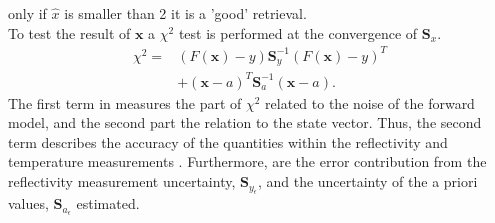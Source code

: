 only if $\hat{x}$ is smaller than \num{2} it is a 'good' retrieval. 
\\
To test the result of $\mathbf{x}$ a $\chi^2$ test is performed at the convergence of $\mathbf{S}_x$.
%
\begin{equation}
\begin{split}
\chi^2 = & \left( F(\mathbf{x}) - y  \right) \mathbf{S}_y^{-1} \left( F(\mathbf{x}) - y \right)^T \\
& + \left( \mathbf{x} - a \right)^T \mathbf{S}_a^{-1} \left( \mathbf{x} - a\right). 
\end{split}
\label{eq:chi}
\end{equation}
%
The first term in  measures the part of $\chi^2$ related to the noise of the forward model, and the second part the relation to the state vector. Thus, the second term describes the accuracy of the quantities within the reflectivity and temperature measurements \citep{rodgers_inverse_2000}.
Furthermore, are the error contribution from the reflectivity measurement uncertainty, $\mathbf{S}_{y_\epsilon}$, and the uncertainty of the a priori values, $\mathbf{S}_{a_\epsilon}$ estimated. 

